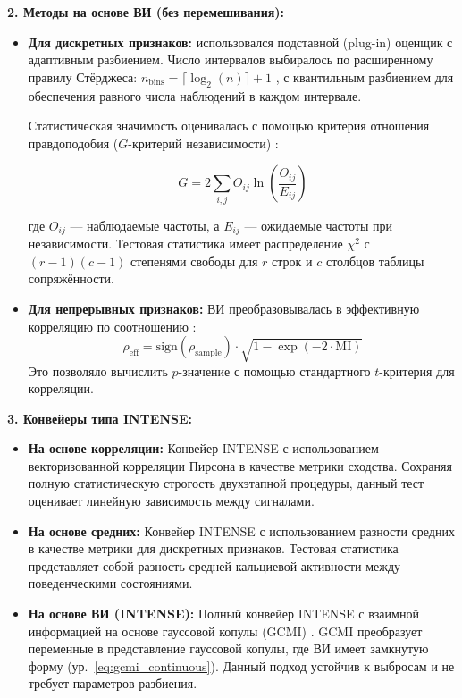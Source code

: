 \textbf{2. Методы на основе ВИ (без перемешивания):}
\begin{itemize}
\item \textbf{Для дискретных признаков:} использовался подставной (plug-in) оценщик с
адаптивным разбиением. Число интервалов выбиралось по расширенному правилу Стёрджеса:
$n_{\text{bins}} = \lceil \log_2(n) \rceil + 1$ \citep{Sturges1926}, с
квантильным разбиением для обеспечения равного числа наблюдений в каждом интервале.

Статистическая значимость оценивалась с помощью критерия отношения правдоподобия ($G$-критерий
независимости) \citep{Sokal1995}:

\begin{equation}
\label{eq:gtest}
G = 2 \sum_{i,j} O_{ij} \ln\left(\frac{O_{ij}}{E_{ij}}\right)
\end{equation}

где $O_{ij}$ --- наблюдаемые частоты, а $E_{ij}$ --- ожидаемые частоты при
независимости. Тестовая статистика имеет распределение $\chi^2$ с $(r-1)(c-1)$
степенями свободы для $r$ строк и $c$ столбцов таблицы сопряжённости.

\item \textbf{Для непрерывных признаков:} ВИ преобразовывалась в эффективную корреляцию
по соотношению \citep{Cover2006}:
\begin{equation}
\label{eq:mi_to_corr}
\rho_{\text{eff}} = \text{sign}(\rho_{\text{sample}}) \cdot \sqrt{1 - \exp(-2 \cdot
\text{MI})}
\end{equation}
Это позволяло вычислить $p$-значение с помощью стандартного $t$-критерия для корреляции.
\end{itemize}

\textbf{3. Конвейеры типа INTENSE:}
\begin{itemize}
\item \textbf{На основе корреляции:} Конвейер INTENSE с использованием векторизованной корреляции Пирсона
в качестве метрики сходства. Сохраняя полную статистическую строгость
двухэтапной процедуры, данный тест оценивает линейную зависимость между сигналами.

\item \textbf{На основе средних:} Конвейер INTENSE с использованием разности средних в качестве
метрики для дискретных признаков. Тестовая статистика представляет собой разность средней кальциевой
активности между поведенческими состояниями.

\item \textbf{На основе ВИ (INTENSE):} Полный конвейер INTENSE с взаимной информацией на основе гауссовой копулы
(GCMI) \citep{gcmi}. GCMI преобразует переменные в представление гауссовой копулы, где ВИ имеет замкнутую форму (ур.~\ref{eq:gcmi_continuous}).
Данный подход устойчив к выбросам и не требует параметров разбиения.
\end{itemize}

